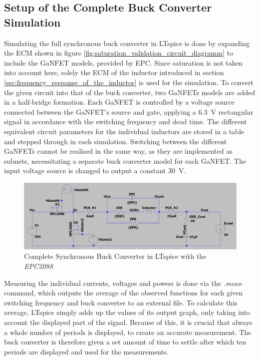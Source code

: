 \subsection{Setup of the Complete Buck Converter Simulation}
Simulating the full synchronous buck converter in LTspice is done by expanding the \ac{ECM} shown in figure \ref{fig:saturation_validation_circuit_diagramm} to include the GaNFET models, provided by EPC. Since saturation is not taken into account here, solely the \ac{ECM} of the inductor introduced in section \ref{sec:frequency_response_of_the_inductor} is used for the simulation. To convert the given circuit into that of the buck converter, two \acp{GaNFET} models are added in a half-bridge formation. Each \ac{GaNFET} is controlled by a voltage source connected between the \ac{GaNFET}'s source and gate, applying a \SI{6.3}{\V} rectangular signal in accordance with the switching frequency and dead time. 
The different equivalent circuit parameters for the individual inductors are stored in a table and stepped through in each simulation. Switching between the different \acp{GaNFET} cannot be realised in the same way, as they are implemented as subnets, necessitating a separate buck converter model for each \ac{GaNFET}. The input voltage source is changed to output a constant \SI{30}{\V}.
\begin{figure}[H]
    \centering
    \includegraphics[width=1\linewidth]{Bilder//Kapitel4/BC_LTspice.png}
    \caption{Complete Synchronous Buck Converter in LTspice with the \textit{EPC2088}}
    \label{fig:BC_LTspice}
\end{figure}
Measuring the individual currents, voltages and powers is done via the \textit{.meas}-command, which outputs the average of the observed functions for each given switching frequency and buck converter to an external file. To calculate this average, LTspice simply adds up the values of its output graph, only taking into account the displayed part of the signal. Because of this, it is crucial that always a whole number of periods is displayed, to create an accurate measurement. The buck converter is therefore given a set amount of time to settle after which ten periods are displayed and used for the measurements. 

